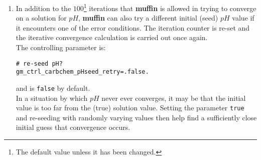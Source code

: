 \documentclass[11pt,fleqn]{book} %
\begin{document}
\begin{enumerate}[noitemsep]
\begin{itemize}[noitemsep]
\begin{enumerate}[noitemsep]
\vspace{1mm}
\item In addition to the \(100\)\footnote{The default value unless it has been changed.} iterations that \textbf{muffin} is allowed in trying to converge on a solution for \(pH\), \textbf{muffin} can also try a different initial (seed) \(pH\) value if it encounters one of the error conditions. The iteration counter is re-set and the iterative convergence calculation is carried out once again. 
\\The controlling parameter is:
\vspace{-0pt}\small\begin{verbatim}
# re-seed pH?
gm_ctrl_carbchem_pHseed_retry=.false.
\end{verbatim}\normalsize\vspace{-0pt}
and is \texttt{false} by default.
\\In a situation by which \(pH\) never ever converges, it may be that the initial value is too far from the (true) solution value. Setting the parameter \texttt{true} and re-seeding with randomly varying values then help find a sufficiently close initial guess that convergence occurs.


\end{enumerate}
\end{itemize}
\end{enumerate}
\end{document}

